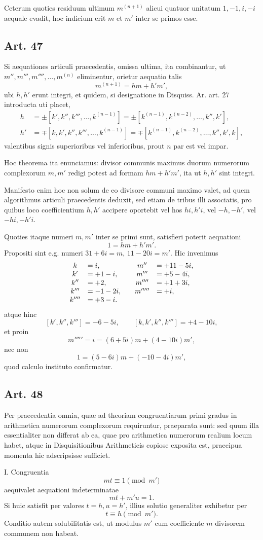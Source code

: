 \documentclass[12pt]{article}
\newcommand{\art}[1]{\subsection*{Art. #1}}
\begin{document}
Ceterum quoties residuum ultimum $m^{(n+1)}$ alicui quatuor unitatum $1,-1,i,-i$ aequale evadit, hoc indicium erit $m$ et $m'$ inter se primos esse.

\art{47}
Si aequationes articuli praecedentis, omissa ultima, ita combinantur, ut $m'',m''',m'''',\ldots,m^{(n)}$ eliminentur, orietur aequatio talis
\[
m^{(n+1)}=hm+h'm',
\]
ubi $h,h'$ erunt integri, et quidem, si designatione in Disquiss. Ar. art. 27 introducta uti placet,
\[
\begin{aligned}
h&=\pm[k',k'',k''',\ldots,k^{(n-1)}]
=\pm[k^{(n-1)},k^{(n-2)},\ldots,k'',k'],\\
h'&=\mp[k,k',k'',k''',\ldots,k^{(n-1)}]
=\mp[k^{(n-1)},k^{(n-2)},\ldots,k'',k',k],
\end{aligned}
\]
valentibus signis superioribus vel inferioribus, prout $n$ par est vel impar.

Hoc theorema ita enunciamus: divisor communis maximus duorum numerorum complexorum $m,m'$ redigi potest ad formam $hm+h'm'$, ita ut $h,h'$ sint integri.

Manifesto enim hoc non solum de eo divisore communi maximo valet, ad quem algorithmus articuli praecedentis deduxit, sed etiam de tribus illi associatis, pro quibus loco coefficientium $h,h'$ accipere oportebit vel hos $hi,h'i$, vel $-h,-h'$, vel $-hi,-h'i$.

Quoties itaque numeri $m,m'$ inter se primi sunt, satisfieri poterit aequationi
\[
1=hm+h'm'.
\]
Propositi sint e.g. numeri $31+6i=m$, $11-20i=m'$. Hic invenimus
\[
\begin{array}{cl@{\qquad}cl}
k&=i,& m''&=+11-5i,\\
k'&=+1-i,& m'''&=+5-4i,\\
k''&=+2,& m''''&=+1+3i,\\
k'''&=-1-2i,& m'''''&=+i,\\
k''''&=+3-i.&&
\end{array}
\]
atque hinc
\[
[k',k'',k''']=-6-5i,
\qquad
[k,k',k'',k''']=+4-10i,
\]
et proin
\[
m'''''=i=(6+5i)m+(4-10i)m',
\]
nec non
\[
1=(5-6i)m+(-10-4i)m',
\]
quod calculo instituto confirmatur.

\art{48}
Per praecedentia omnia, quae ad theoriam congruentiarum primi gradus in arithmetica numerorum complexorum requiruntur, praeparata sunt: sed quum illa essentialiter non differat ab ea, quae pro arithmetica numerorum realium locum habet, atque in Disquisitionibus Arithmeticis copiose exposita est, praecipua momenta hic adscripsisse sufficiet.

I. Congruentia
\[
mt\equiv 1 \pmod {m'}
\]
aequivalet aequationi indeterminatae
\[
mt+m'u=1.
\]
Si huic satisfit per valores $t=h,u=h'$, illius solutio generaliter exhibetur per
\[
t\equiv h\pmod {m'}.
\]
Conditio autem solubilitatis est, ut modulus $m'$ cum coefficiente $m$ divisorem communem non habeat.
\end{document}
